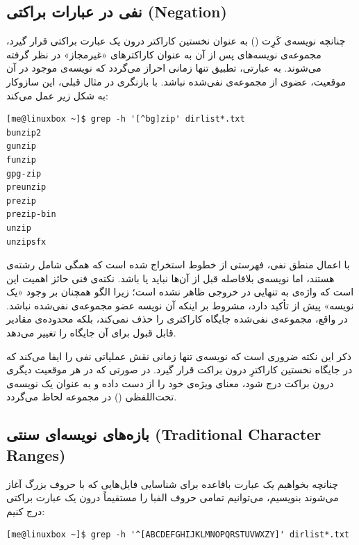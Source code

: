 \subsection{نفی در عبارات براکتی (Negation)}

چنانچه نویسه‌ی کَرِت (\cmd{\^{}}) به عنوان نخستین کاراکتر درون یک عبارت براکتی قرار گیرد، مجموعه‌ی نویسه‌های پس از آن به عنوان کاراکترهای «غیرمجاز» در نظر گرفته می‌شوند. به عبارتی، تطبیق تنها زمانی احراز می‌گردد که نویسه‌ی موجود در آن موقعیت، عضوی از مجموعه‌ی نفی‌شده نباشد. با بازنگری در مثال قبلی، این سازوکار به شکل زیر عمل می‌کند:

\begin{latin}
\begin{lstlisting}
[me@linuxbox ~]$ grep -h '[^bg]zip' dirlist*.txt
bunzip2
gunzip
funzip
gpg-zip
preunzip
prezip
prezip-bin
unzip
unzipsfx
\end{lstlisting}
\end{latin}

با اعمال منطق نفی، فهرستی از خطوط استخراج شده است که همگی شامل رشته‌ی  هستند، اما نویسه‌ی بلافاصله قبل از آن‌ها نباید  یا  باشد. نکته‌ی فنی حائز اهمیت این است که واژه‌ی  به تنهایی در خروجی ظاهر نشده است؛ زیرا الگو همچنان بر وجود «یک نویسه» پیش از  تأکید دارد، مشروط بر اینکه آن نویسه عضو مجموعه‌ی نفی‌شده نباشد. در واقع، مجموعه‌ی نفی‌شده جایگاه کاراکتری را حذف نمی‌کند، بلکه محدوده‌ی مقادیر قابل قبول برای آن جایگاه را تغییر می‌دهد.

ذکر این نکته ضروری است که نویسه‌ی \cmd{\^{}} تنها زمانی نقش عملیاتی نفی را ایفا می‌کند که در جایگاه نخستین کاراکترِ درون براکت قرار گیرد. در صورتی که در هر موقعیت دیگری درون براکت درج شود، معنای ویژه‌ی خود را از دست داده و به عنوان یک نویسه‌ی تحت‌اللفظی () در مجموعه لحاظ می‌گردد.

\subsection{بازه‌های نویسه‌ای سنتی (Traditional Character Ranges)}

چنانچه بخواهیم یک عبارت باقاعده برای شناسایی فایل‌هایی که با حروف بزرگ آغاز می‌شوند بنویسیم، می‌توانیم تمامی حروف الفبا را مستقیماً درون یک عبارت براکتی درج کنیم:

\begin{latin}
\begin{lstlisting}
[me@linuxbox ~]$ grep -h '^[ABCDEFGHIJKLMNOPQRSTUVWXZY]' dirlist*.txt
\end{lstlisting}
\end{latin}

